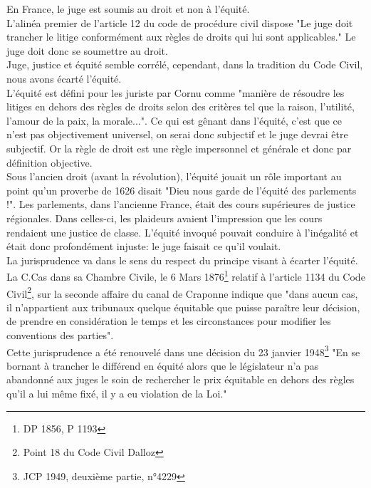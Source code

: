 En France, le juge est soumis au droit et non à l'équité. \\
L'alinéa premier de l'article 12 du code de procédure civil dispose "Le juge doit trancher le litige conformément aux règles de droits qui lui sont applicables." Le juge doit donc se soumettre au droit. \\
Juge, justice et équité semble corrélé, cependant, dans la tradition du Code Civil, nous avons écarté l'équité. \\
L'équité est défini pour les juriste par Cornu comme "manière de résoudre les litiges en dehors des règles de droits selon des critères tel que la raison, l'utilité, l'amour de la paix, la morale...". Ce qui est gênant dans l'équité, c'est que ce n'est pas objectivement universel, on serai donc subjectif et le juge devrai être subjectif. Or la règle de droit est une règle impersonnel et générale et donc par définition objective. \\
Sous l'ancien droit (avant la révolution), l'équité jouait un rôle important au point qu'un proverbe de 1626 disait "Dieu nous garde de l'équité des parlements !". Les parlements, dans l'ancienne France, était des cours supérieures de justice régionales. Dans celles-ci, les plaideurs avaient l'impression que les cours rendaient une justice de classe. L'équité invoqué pouvait conduire à l'inégalité et était donc profondément injuste: le juge faisait ce qu'il voulait. \\
La jurisprudence va dans le sens du respect du principe visant à écarter l'équité. La C.Cas dans sa Chambre Civile, le 6 Mars 1876\footnote{DP 1856, P 1193} relatif à l'article 1134 du Code Civil\footnote{Point 18 du Code Civil Dalloz}, sur la seconde affaire du canal de Craponne indique que "dans aucun cas, il n'appartient aux tribunaux quelque équitable que puisse paraître leur décision, de prendre en considération le temps et les circonstances pour modifier les conventions des parties". \\ 
Cette jurisprudence a été renouvelé dans une décision du 23 janvier 1948\footnote{JCP 1949, deuxième partie, n°4229} "En se bornant à trancher le différend en équité alors que le législateur n'a pas abandonné aux juges le soin de rechercher le prix équitable en dehors des règles qu'il a lui même fixé, il y a eu violation de la Loi."


